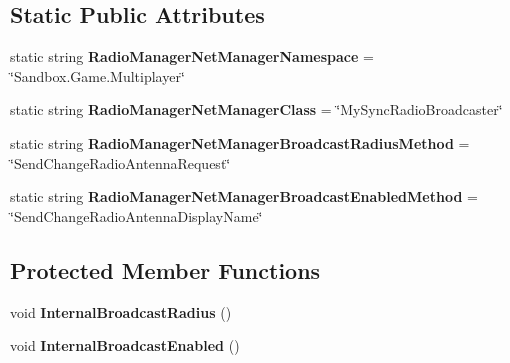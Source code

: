 \subsection*{Static Public Attributes}
\begin{DoxyCompactItemize}
\item 
\hypertarget{class_s_e_mod_a_p_i_internal_1_1_a_p_i_1_1_common_1_1_radio_manager_network_manager_af4cae5bc31d34803a8bc819ff2450b3b}{}static string {\bfseries Radio\+Manager\+Net\+Manager\+Namespace} = \char`\"{}Sandbox.\+Game.\+Multiplayer\char`\"{}\label{class_s_e_mod_a_p_i_internal_1_1_a_p_i_1_1_common_1_1_radio_manager_network_manager_af4cae5bc31d34803a8bc819ff2450b3b}

\item 
\hypertarget{class_s_e_mod_a_p_i_internal_1_1_a_p_i_1_1_common_1_1_radio_manager_network_manager_a2d4fcb9ea26de5dfc37d6cd0c578b8d2}{}static string {\bfseries Radio\+Manager\+Net\+Manager\+Class} = \char`\"{}My\+Sync\+Radio\+Broadcaster\char`\"{}\label{class_s_e_mod_a_p_i_internal_1_1_a_p_i_1_1_common_1_1_radio_manager_network_manager_a2d4fcb9ea26de5dfc37d6cd0c578b8d2}

\item 
\hypertarget{class_s_e_mod_a_p_i_internal_1_1_a_p_i_1_1_common_1_1_radio_manager_network_manager_aa604a46d31303c0335cd0f30b371728e}{}static string {\bfseries Radio\+Manager\+Net\+Manager\+Broadcast\+Radius\+Method} = \char`\"{}Send\+Change\+Radio\+Antenna\+Request\char`\"{}\label{class_s_e_mod_a_p_i_internal_1_1_a_p_i_1_1_common_1_1_radio_manager_network_manager_aa604a46d31303c0335cd0f30b371728e}

\item 
\hypertarget{class_s_e_mod_a_p_i_internal_1_1_a_p_i_1_1_common_1_1_radio_manager_network_manager_a686a7eaeaee2d265243309af3c119126}{}static string {\bfseries Radio\+Manager\+Net\+Manager\+Broadcast\+Enabled\+Method} = \char`\"{}Send\+Change\+Radio\+Antenna\+Display\+Name\char`\"{}\label{class_s_e_mod_a_p_i_internal_1_1_a_p_i_1_1_common_1_1_radio_manager_network_manager_a686a7eaeaee2d265243309af3c119126}

\end{DoxyCompactItemize}
\subsection*{Protected Member Functions}
\begin{DoxyCompactItemize}
\item 
\hypertarget{class_s_e_mod_a_p_i_internal_1_1_a_p_i_1_1_common_1_1_radio_manager_network_manager_a5055bae71664c4a9a3be3a5324f61c47}{}void {\bfseries Internal\+Broadcast\+Radius} ()\label{class_s_e_mod_a_p_i_internal_1_1_a_p_i_1_1_common_1_1_radio_manager_network_manager_a5055bae71664c4a9a3be3a5324f61c47}

\item 
\hypertarget{class_s_e_mod_a_p_i_internal_1_1_a_p_i_1_1_common_1_1_radio_manager_network_manager_afc61666b133193cf195f988a748da216}{}void {\bfseries Internal\+Broadcast\+Enabled} ()\label{class_s_e_mod_a_p_i_internal_1_1_a_p_i_1_1_common_1_1_radio_manager_network_manager_afc61666b133193cf195f988a748da216}

\end{DoxyCompactItemize}
